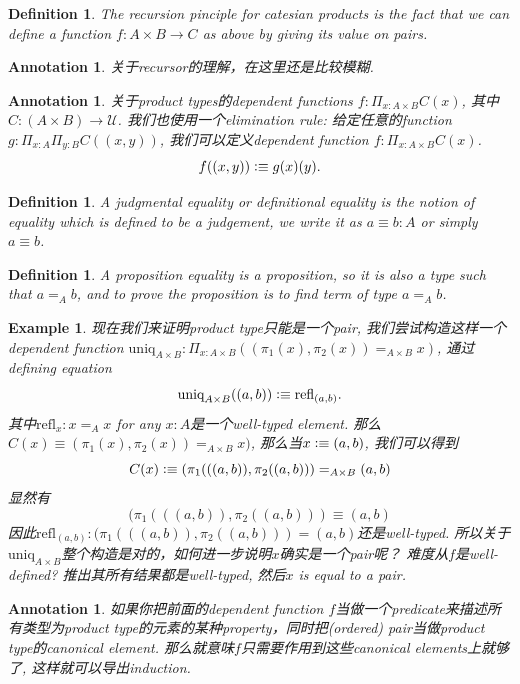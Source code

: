 \documentclass{article}
\newtheorem{example}[theorem]{Example}
\newtheorem{definition}[theorem]{Definition}
\newtheorem{annotation}[theorem]{Annotation}
\newcommand{\defeqv}{\vcentcolon\equiv}
\begin{document}
\begin{definition}
\rm The recursion pinciple for catesian products is the fact that we can define a function $f:A \times B \to C$ as above by giving its value on pairs.
\end{definition}

\begin{annotation}
\rm 关于recursor的理解，在这里还是比较模糊.
\end{annotation}

\begin{annotation}
\rm 关于product types的dependent functions $f: \Pi_{x:A\times B}C(x)$, 其中$C: (A \times B) \to \mathcal{U}$. 我们也使用一个elimination rule: 给定任意的function $g:\Pi_{x:A}\Pi_{y:B}C((x,y))$, 我们可以定义dependent function $f: \Pi_{x:A\times B}C(x)$.
\[
	f((x,y)) \defeqv g(x)(y).
\]
\end{annotation}

\begin{definition}
\rm A judgmental equality or definitional equality is the notion of equality which is defined to be a judgement, we write it as $a \equiv b : A$ or simply $a \equiv b$.
\end{definition}

\begin{definition}
\rm A proposition equality is a proposition, so it is also a type such that $a =_A b$, and to prove the proposition is to find term of type $a =_A b$.
\end{definition}

\begin{example}
\rm 现在我们来证明product type只能是一个pair, 我们尝试构造这样一个dependent function $\text{uniq}_{A \times B}:\Pi_{x:A \times B}((\pi_1(x),\pi_2(x)) =_{A \times B} x)$, 通过defining equation
\[
	\text{uniq}_{A \times B}((a,b)) \defeqv \text{refl}_{(a,b)}.
\]
其中$\text{refl}_{x}: x =_A x$ for any $x:A$是一个well-typed element. 那么$C(x) \equiv (\pi_1(x),\pi_2(x)) =_{A \times B} x)$, 那么当$x \defeqv (a,b)$, 我们可以得到
\[
	C(x) \defeqv (\pi_1(((a,b)),\pi_2((a,b))) =_{A \times B} (a,b)
\]
显然有
\[
	(\pi_1(((a,b)),\pi_2((a,b))) \equiv (a,b)
\]
因此$\text{refl}_{(a,b)}: (\pi_1(((a,b)),\pi_2((a,b))) = (a,b)$还是well-typed. 所以关于$\text{uniq}_{A \times B}$整个构造是对的，如何进一步说明$x$确实是一个pair呢？ 难度从$f$是well-defined? 推出其所有结果都是well-typed, 然后$x$ is equal to a pair.
\end{example}


\begin{annotation}
\rm 如果你把前面的dependent function $f$当做一个predicate来描述所有类型为product type的元素的某种property，同时把(ordered) pair当做product type的canonical element. 那么就意味$f$只需要作用到这些canonical elements上就够了, 这样就可以导出induction.
\end{annotation}
\end{document}

